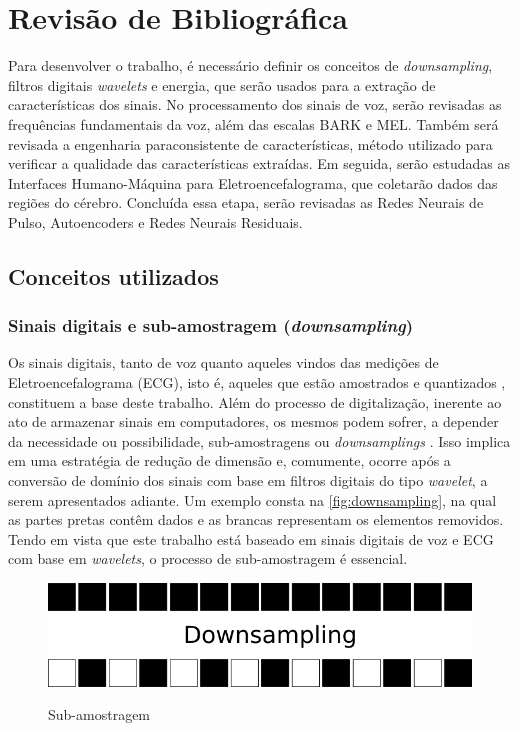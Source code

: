 \chapter{Revisão de Bibliográfica}
	\label{ch:revisao}
	\par Para desenvolver o trabalho, é necessário definir os conceitos de \textit{downsampling}, filtros digitais \textit{wavelets} e energia, que serão usados para a extração de características dos sinais. No processamento dos sinais de voz, serão revisadas as frequências fundamentais da voz, além das escalas BARK e MEL. Também será revisada a engenharia paraconsistente de características, método utilizado para verificar a qualidade das características extraídas. Em seguida, serão estudadas as Interfaces Humano-Máquina para Eletroencefalograma, que coletarão dados das regiões do cérebro. Concluída essa etapa, serão revisadas as Redes Neurais de Pulso, Autoencoders e Redes Neurais Residuais.

	\section{Conceitos utilizados}
		\subsection{Sinais digitais e sub-amostragem (\textit{downsampling})}
			\par Os sinais digitais, tanto de voz quanto aqueles vindos das medições de Eletroencefalograma (ECG), isto é, aqueles que estão amostrados e quantizados \cite{haykin2011sistemas}, constituem a base deste trabalho. Além do processo de digitalização, inerente ao ato de armazenar sinais em computadores, os mesmos podem sofrer, a depender da necessidade ou possibilidade, sub-amostragens ou \textit{downsamplings} \cite{robi2003}. Isso implica em uma estratégia de redução de dimensão e, comumente, ocorre após a conversão de domínio dos sinais com base em filtros digitais do tipo \textit{wavelet}, a serem apresentados adiante. Um exemplo consta na  \autoref{fig:downsampling}, na qual as partes pretas contêm dados e as brancas representam os elementos removidos. Tendo em vista que este trabalho está baseado em sinais digitais de voz e ECG com base em \textit{wavelets}, o processo de sub-amostragem é essencial. 
			\begin{figure}[h]
				\centering
				\caption{Sub-amostragem}
				\includegraphics[width=0.4\linewidth]{images/downsampling}
				\label{fig:downsampling}
			\end{figure}
	

